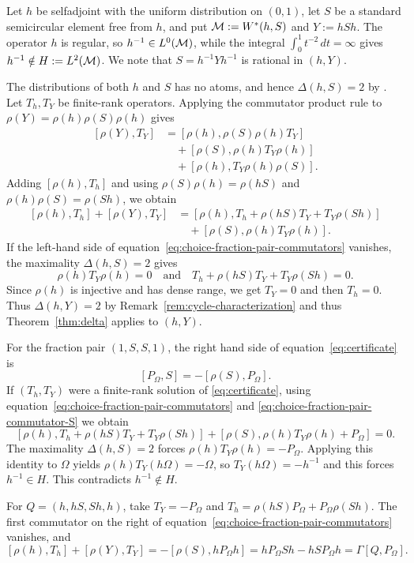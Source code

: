 \begin{example}\label{ex:choice-fraction-pair}
Let $h$ be selfadjoint with the uniform distribution on $(0,1)$, let $S$ be a standard semicircular element free from $h$, and put $\mathcal M:=W^*(h,S)$ and $Y:=hSh$.
The operator $h$ is regular, so $h^{-1}\in L^0(\mathcal M)$, while the integral $\int_0^1 t^{-2}\,dt=\infty$ gives $h^{-1}\notin H:=L^2(\mathcal M)$.
We note that $S=h^{-1}Yh^{-1}$ is rational in $(h,Y)$.

The distributions of both $h$ and $S$ has no atoms, and hence $\Delta(h,S)=2$ by \cite[Section~6.1]{MSY23}.
Let $T_h,T_Y$ be finite-rank operators.
Applying the commutator product rule to $\rho(Y)=\rho(h)\rho(S)\rho(h)$ gives
\[
 \begin{aligned}
 [\rho(Y),T_Y]
 &=[\rho(h),\rho(S)\rho(h)T_Y]\\
 &\quad+[\rho(S),\rho(h)T_Y\rho(h)]\\
 &\quad+[\rho(h),T_Y\rho(h)\rho(S)].
 \end{aligned}
\]
Adding $[\rho(h),T_h]$ and using $\rho(S)\rho(h)=\rho(hS)$ and $\rho(h)\rho(S)=\rho(Sh)$, we obtain
\begin{equation}\label{eq:choice-fraction-pair-commutators}
 \begin{aligned}
 [\rho(h),T_h]+[\rho(Y),T_Y]
 &= [\rho(h),T_h+\rho(hS)T_Y+T_Y\rho(Sh)]\\
 &\quad+[\rho(S),\rho(h)T_Y\rho(h)].
 \end{aligned}
\end{equation}
If the left-hand side of equation~\eqref{eq:choice-fraction-pair-commutators} vanishes, the maximality $\Delta(h,S)=2$ gives
\[
\rho(h)T_Y\rho(h)=0 \quad\text{and}\quad T_h+\rho(hS)T_Y+T_Y\rho(Sh)=0.
\]
Since $\rho(h)$ is injective and has dense range, we get $T_Y=0$ and then $T_h=0$.
Thus $\Delta(h,Y)=2$ by Remark~\ref{rem:cycle-characterization} and thus Theorem~\ref{thm:delta} applies to $(h,Y)$.

For the fraction pair $(1,S,S,1)$, the right hand side of equation~\eqref{eq:certificate} is
\begin{equation}\label{eq:choice-fraction-pair-commutator-S}
[P_\Omega,S]=-[\rho(S),P_\Omega].
\end{equation}
If $(T_h,T_Y)$ were a finite-rank solution of \eqref{eq:certificate}, using equation~\eqref{eq:choice-fraction-pair-commutators} and \eqref{eq:choice-fraction-pair-commutator-S} we obtain
\[
 [\rho(h),T_h+\rho(hS)T_Y+T_Y\rho(Sh)]+[\rho(S),\rho(h)T_Y\rho(h)+P_\Omega]=0.
\]
The maximality $\Delta(h,S)=2$ forces $\rho(h)T_Y\rho(h)=-P_\Omega$.
Applying this identity to $\Omega$ yields $\rho(h)T_Y(h\Omega)=-\Omega$, so $T_Y(h\Omega)=-h^{-1}$ and this forces $h^{-1}\in H$.
This contradicts $h^{-1}\notin H$.

For $Q=(h,hS,Sh,h)$, take $T_Y=-P_\Omega$ and $T_h=\rho(hS)P_\Omega+P_\Omega\rho(Sh)$.
The first commutator on the right of equation~\eqref{eq:choice-fraction-pair-commutators} vanishes, and
\[
 [\rho(h),T_h]+[\rho(Y),T_Y]
 =-[\rho(S),hP_\Omega h]
 =hP_\Omega S h-hS P_\Omega h
 =\Gamma[Q,P_\Omega].
\]
\end{example}

